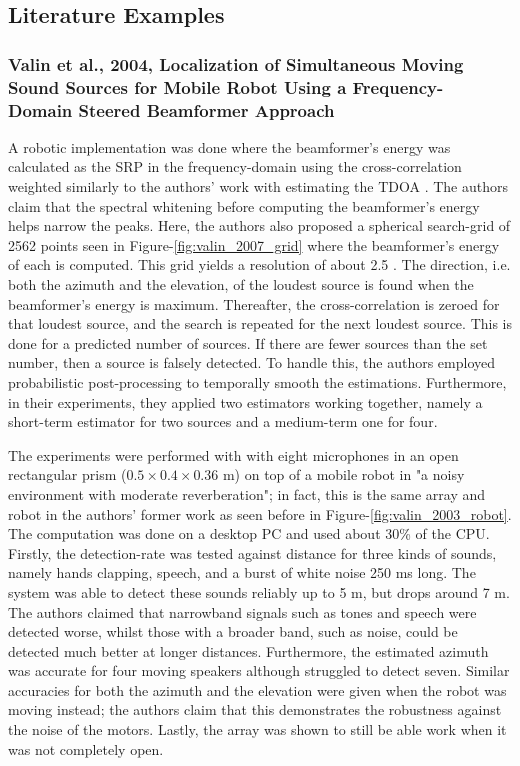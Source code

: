 \documentclass[notitlepage]{report}
\begin{document}


\subsection{Literature Examples}

\subsubsection{Valin et al., 2004, Localization of Simultaneous Moving Sound Sources for Mobile Robot Using a Frequency- Domain Steered Beamformer Approach}

A robotic implementation \cite{valin_localization_2004} was done where the beamformer's energy was calculated as the SRP in the frequency-domain using the cross-correlation weighted similarly to the authors' work with estimating the TDOA \cite{valin_robust_2003}. The authors claim that the spectral whitening before computing the beamformer's energy helps narrow the peaks. Here, the authors also proposed a spherical search-grid of 2562 points seen in Figure-\ref{fig:valin_2007_grid} where the beamformer's energy of each is computed. This grid yields a resolution of about 2.5 \si{\deg}. The direction, i.e. both the azimuth and the elevation, of the loudest source is found when the beamformer's energy is maximum. Thereafter, the cross-correlation is zeroed for that loudest source, and the search is repeated for the next loudest source. This is done for a predicted number of sources. If there are fewer sources than the set number, then a source is falsely detected. To handle this, the authors employed probabilistic post-processing to temporally smooth the estimations. Furthermore, in their experiments, they applied two estimators working together, namely a short-term estimator for two sources and a medium-term one for four. 

The experiments were performed with with eight microphones in an open rectangular prism ($0.5\times 0.4\times 0.36$ \si{m}) on top of a mobile robot in "a noisy environment with moderate reverberation"; in fact, this is the same array and robot in the authors' former work \cite{valin_robust_2003} as seen before in Figure-\ref{fig:valin_2003_robot}. The computation was done on a desktop PC and used about 30\% of the CPU. Firstly, the detection-rate was tested against distance for three kinds of sounds, namely hands clapping, speech, and a burst of white noise 250 \si{ms} long. The system was able to detect these sounds reliably up to 5 \si{m}, but drops around 7 \si{m}. The authors claimed that narrowband signals such as tones and speech were detected worse, whilst those with a broader band, such as noise, could be detected much better at longer distances. Furthermore, the estimated azimuth was accurate for four moving speakers although struggled to detect seven. Similar accuracies for both the azimuth and the elevation were given when the robot was moving instead; the authors claim that this demonstrates the robustness against the noise of the motors. Lastly, the array was shown to still be able work when it was not completely open.
\end{document}
